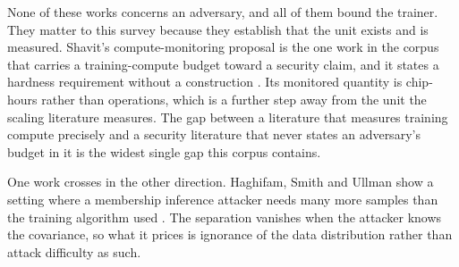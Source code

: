None of these works concerns an adversary, and all of them bound the trainer. They
matter to this survey because they establish that the unit exists and is measured.
Shavit's compute-monitoring proposal is the one work in the corpus that carries a
training-compute budget toward a security claim, and it states a hardness
requirement without a construction \cite{Sha23}. Its monitored quantity is
chip-hours rather than operations, which is a further step away from the unit the
scaling literature measures. The gap between a literature that measures training
compute precisely and a security literature that never states an adversary's budget
in it is the widest single gap this corpus contains.

One work crosses in the other direction. Haghifam, Smith and Ullman show a setting
where a membership inference attacker needs many more samples than the training
algorithm used \cite{HSU25}. The separation vanishes when the attacker knows the
covariance, so what it prices is ignorance of the data distribution rather than
attack difficulty as such.
